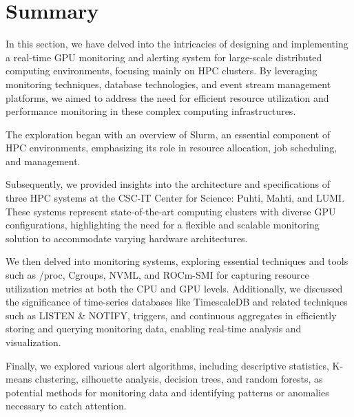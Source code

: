 
\section{Summary}
In this section, we have delved into the intricacies of designing and implementing a real-time GPU monitoring and alerting system for large-scale distributed computing environments, focusing mainly on HPC clusters. By leveraging monitoring techniques, database technologies, and event stream management platforms, we aimed to address the need for efficient resource utilization and performance monitoring in these complex computing infrastructures.

The exploration began with an overview of Slurm, an essential component of HPC environments, emphasizing its role in resource allocation, job scheduling, and management.

Subsequently, we provided insights into the architecture and specifications of three HPC systems at the CSC-IT Center for Science: Puhti, Mahti, and LUMI. These systems represent state-of-the-art computing clusters with diverse GPU configurations, highlighting the need for a flexible and scalable monitoring solution to accommodate varying hardware architectures.

We then delved into monitoring systems, exploring essential techniques and tools such as /proc, Cgroups, NVML, and ROCm-SMI for capturing resource utilization metrics at both the CPU and GPU levels. Additionally, we discussed the significance of time-series databases like TimescaleDB and related techniques such as LISTEN \& NOTIFY, triggers, and continuous aggregates in efficiently storing and querying monitoring data, enabling real-time analysis and visualization.


Finally, we explored various alert algorithms, including descriptive statistics, K-means clustering, silhouette analysis, decision trees, and random forests, as potential methods for monitoring data and identifying patterns or anomalies necessary to catch attention.
